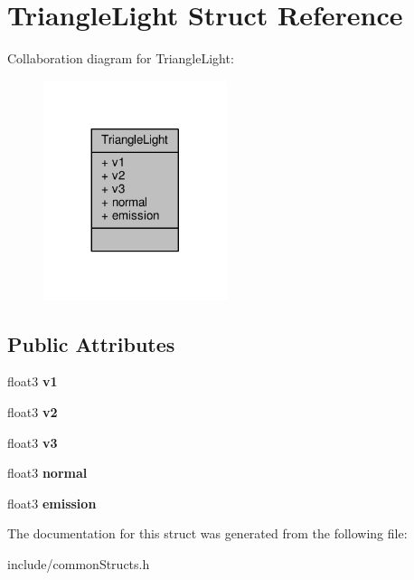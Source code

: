 \hypertarget{struct_triangle_light}{\section{Triangle\-Light Struct Reference}
\label{struct_triangle_light}
}


Collaboration diagram for Triangle\-Light\-:
\nopagebreak
\begin{figure}[H]
\begin{center}
\leavevmode
\includegraphics[width=152pt]{struct_triangle_light__coll__graph}
\end{center}
\end{figure}
\subsection*{Public Attributes}
\begin{DoxyCompactItemize}
\item 
\hypertarget{struct_triangle_light_ad728518bd6f6aa9c27e57324b73e11cd}{float3 {\bfseries v1}}\label{struct_triangle_light_ad728518bd6f6aa9c27e57324b73e11cd}

\item 
\hypertarget{struct_triangle_light_ab0f677592aaccf4bc1f4a09e6d700ecd}{float3 {\bfseries v2}}\label{struct_triangle_light_ab0f677592aaccf4bc1f4a09e6d700ecd}

\item 
\hypertarget{struct_triangle_light_af37efa71a236143896c997bd106a2387}{float3 {\bfseries v3}}\label{struct_triangle_light_af37efa71a236143896c997bd106a2387}

\item 
\hypertarget{struct_triangle_light_ad827ee5837143ecd0550e039741d0dcd}{float3 {\bfseries normal}}\label{struct_triangle_light_ad827ee5837143ecd0550e039741d0dcd}

\item 
\hypertarget{struct_triangle_light_a219a20a61a39b8d31ef516ceece4bcd0}{float3 {\bfseries emission}}\label{struct_triangle_light_a219a20a61a39b8d31ef516ceece4bcd0}

\end{DoxyCompactItemize}


The documentation for this struct was generated from the following file\-:\begin{DoxyCompactItemize}
\item 
include/common\-Structs.\-h\end{DoxyCompactItemize}
